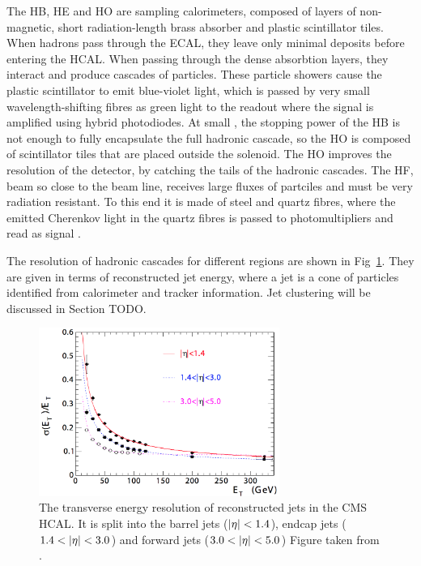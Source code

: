 The HB, HE and HO are sampling calorimeters, composed of layers of non-magnetic, short radiation-length brass absorber and plastic scintillator tiles.
When hadrons pass through the ECAL, they leave only minimal deposits before entering the HCAL. 
When passing through the dense absorbtion layers, they interact and produce cascades of particles. 
These particle showers cause the plastic scintillator to emit blue-violet light, which is passed by very small wavelength-shifting fibres as green light to the readout where the signal is amplified using hybrid photodiodes.
At small \abseta{}, the stopping power of the HB is not enough to fully encapsulate the full hadronic cascade, so the HO is composed of scintillator tiles that are placed outside the solenoid. 
The HO improves the \MET{} resolution of the detector, by catching the tails of the hadronic cascades.
The HF, beam so close to the beam line, receives large fluxes of partciles and must be very radiation resistant.
To this end it is made of steel and quartz fibres, where the emitted Cherenkov light in the quartz fibres is passed to photomultipliers and read as signal \cite{HF}.

The resolution of hadronic cascades for different \abseta{} regions are shown in Fig~\ref{fig:CMSHCALRes}. 
They are given in terms of reconstructed jet energy, where a jet is a cone of particles identified from calorimeter and tracker information. 
Jet clustering will be discussed in Section TODO.
\begin{figure}[htpb]
	\centering
	\includegraphics[width=0.7\textwidth]{Figures/CMSHCALRES}
	\caption[The transverse energy resolution of reconstructed jets in the CMS HCAL. It is split into the barrel jets ($\abseta<1.4$), endcap jets ($1.4<\abseta<3.0$) and forward jets ($3.0<\abseta<5.0$)]{The transverse energy resolution of reconstructed jets in the CMS HCAL. It is split into the barrel jets ($\abseta<1.4$), endcap jets ($1.4<\abseta<3.0$) and forward jets ($3.0<\abseta<5.0$) Figure taken from \cite{CMSExperiment}.}
	\label{fig:CMSHCALRes}
\end{figure}

